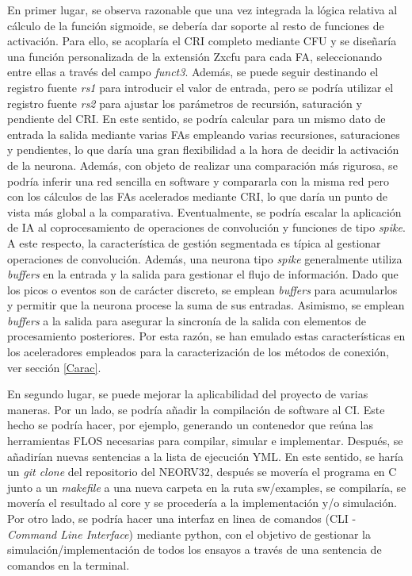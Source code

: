 En primer lugar, se observa razonable que una vez integrada la lógica relativa al cálculo de la función sigmoide, se debería dar soporte al resto de funciones de activación.
Para ello, se acoplaría el CRI completo mediante CFU y se diseñaría una función personalizada de la extensión Zxcfu para cada FA, seleccionando entre ellas a través del campo \textit{funct3}.
Además,  se puede seguir destinando el registro fuente \textit{rs1} para introducir el valor de entrada, pero se podría utilizar el registro fuente \textit{rs2} para ajustar los parámetros de recursión, saturación y pendiente del CRI.
En este sentido, se podría calcular para un mismo dato de entrada la salida mediante varias FAs empleando varias recursiones, saturaciones y pendientes, lo que daría una gran flexibilidad a la hora de decidir la activación de la neurona.
Además, con objeto de realizar una comparación más rigurosa, se podría inferir una red sencilla en software y compararla con la misma red pero con los cálculos de las FAs acelerados mediante CRI, lo que daría un punto de vista más global a la comparativa.
Eventualmente, se podría escalar la aplicación de IA al coprocesamiento de operaciones de convolución y funciones de tipo \textit{spike}.
A este respecto, la característica de gestión segmentada es típica al gestionar operaciones de convolución.
Además, una neurona tipo \textit{spike} generalmente utiliza \textit{buffers} en la entrada y la salida para gestionar el flujo de información.
Dado que los picos o eventos son de carácter discreto, se emplean \textit{buffers} para acumularlos y permitir que la neurona procese la suma de sus entradas.
Asimismo, se emplean \textit{buffers} a la salida para asegurar la sincronía de la salida con elementos de procesamiento posteriores.
Por esta razón, se han emulado estas características en los aceleradores empleados para la caracterización de los métodos de conexión, ver sección \ref{Carac}.

En segundo lugar, se puede mejorar la aplicabilidad del proyecto de varias maneras.
Por un lado, se podría añadir la compilación de software al CI. 
Este hecho se podría hacer, por ejemplo, generando un contenedor que reúna las herramientas FLOS necesarias para compilar, simular e implementar.
Después, se añadirían nuevas sentencias a la lista de ejecución YML.
En este sentido, se haría un \textit{git clone} del repositorio del NEORV32, después se movería el programa en C junto a un \textit{makefile} a una nueva carpeta en la ruta sw/examples, se compilaría, se movería el resultado al core y se procedería a la implementación y/o simulación.
Por otro lado, se podría hacer una interfaz en linea de comandos (CLI - \textit{Command Line Interface}) mediante python, con el objetivo de gestionar la simulación/implementación de todos los ensayos a través de una sentencia de comandos en la terminal.

